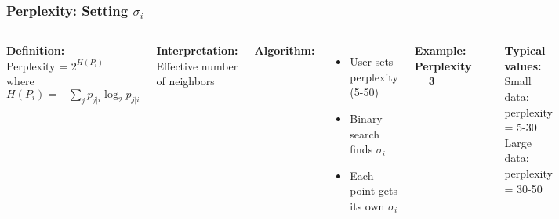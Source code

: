 \documentclass[aspectratio=169]{beamer}
\begin{document}
\begin{frame}
\frametitle{Perplexity: Setting $\sigma_i$}
\begin{columns}[T]
\textbf{Definition:}\\
Perplexity = $2^{H(P_i)}$\\
where $H(P_i) = -\sum_j p_{j|i} \log_2 p_{j|i}$

\vspace{0.3cm}
\textbf{Interpretation:}\\
Effective number of neighbors

\vspace{0.3cm}
\textbf{Algorithm:}
\begin{itemize}
\small
\item User sets perplexity (5-50)
\item Binary search finds $\sigma_i$
\item Each point gets its own $\sigma_i$
\end{itemize}

\textbf{Example: Perplexity = 3}
\begin{center}
\end{center}

\textbf{Typical values:}\\
Small data: perplexity = 5-30\\
Large data: perplexity = 30-50
\end{columns}
\end{frame}
\end{document}
